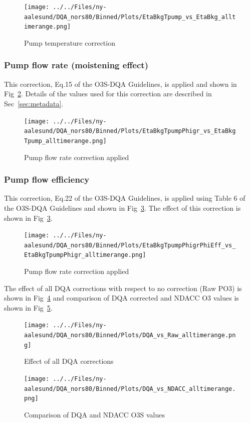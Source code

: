 \documentclass{article}
\begin{document}
\begin{figure}
\centering
\texttt{[image: ../../Files/ny-aalesund/DQA\_nors80/Binned/Plots/EtaBkgTpump\_vs\_EtaBkg\_alltimerange.png]}
\caption{Pump temperature correction }
\label{fig:tpump}
\end{figure}
\subsubsection{Pump flow rate (moistening effect)}
This correction, Eq.15 of the O3S-DQA Guidelines, is applied and shown in Fig~\ref{fig:pf_ptu}.
Details of the values used for this correction are described in Sec~\ref{sec:metadata}.

%
\begin{figure}
\centering
\texttt{[image: ../../Files/ny-aalesund/DQA\_nors80/Binned/Plots/EtaBkgTpumpPhigr\_vs\_EtaBkgTpump\_alltimerange.png]}
\caption{Pump flow rate correction applied}
\label{fig:pf_ptu}
\end{figure}
\subsubsection{Pump flow efficiency}
This correction, Eq.22 of the O3S-DQA Guidelines, is applied using Table 6 of the O3S-DQA Guidelines and
shown in Fig~\ref{fig:pf_eff}.
The effect of this correction is shown in Fig~\ref{fig:pf_eff}.
%
\begin{figure}
\centering
\texttt{[image: ../../Files/ny-aalesund/DQA\_nors80/Binned/Plots/EtaBkgTpumpPhigrPhiEff\_vs\_EtaBkgTpumpPhigr\_alltimerange.png]}
\caption{Pump flow rate correction applied}
\label{fig:pf_eff}
\end{figure}

%
The effect of all DQA corrections with respect to no correction (Raw PO3) is shown in Fig~\ref{fig:dqa_all}
and comparison of DQA corrected and
NDACC O3 values is shown in Fig~\ref{fig:fig_dqa_ndacc}.

\begin{figure}
\centering
\texttt{[image: ../../Files/ny-aalesund/DQA\_nors80/Binned/Plots/DQA\_vs\_Raw\_alltimerange.png]}
\caption{Effect of all DQA corrections}
\label{fig:dqa_all}
\end{figure}
%
\begin{figure}
\centering
\texttt{[image: ../../Files/ny-aalesund/DQA\_nors80/Binned/Plots/DQA\_vs\_NDACC\_alltimerange.png]}
\caption{Comparison of DQA and NDACC O3S values}
\label{fig:fig_dqa_ndacc}
\end{figure}
\end{document}
